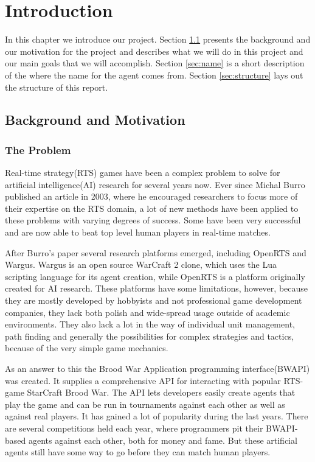 
\chapter{Introduction}
In this chapter we introduce our project. Section \ref{sec:background} presents the background and our motivation for the project and describes what we will do in this project and our main goals that we will accomplish. Section \ref{sec:name} is a short description of the where the name for the agent comes from. Section \ref{sec:structure} lays out the structure of this report.

\section{Background and Motivation}
\label{sec:background}

\subsection{The Problem}
Real-time strategy(RTS) games have been a complex problem to solve for artificial intelligence(AI) research for several years now. Ever since Michal Burro published an article in 2003\cite{buro2003real}, where he encouraged researchers to focus more of their expertise on the RTS domain, a lot of new methods have been applied to these problems with varying degrees of success. Some have been very successful and are now able to beat top level human players in real-time matches.\cite{campbell2002deep}

After Burro's paper several research platforms emerged, including OpenRTS\cite{buro2003orts} and Wargus\cite{wargus}. Wargus is an open source WarCraft 2 clone, which uses the Lua scripting language for its agent creation, while OpenRTS is a platform originally created for AI research. These platforms have some limitations, however, because they are mostly developed by hobbyists and not professional game development companies, they lack both polish and wide-spread usage outside of academic environments. They also lack a lot in the way of individual unit management, path finding and generally the possibilities for complex strategies and tactics, because of the very simple game mechanics.

As an answer to this the Brood War Application programming interface(BWAPI) was created. It supplies a comprehensive API for interacting with popular RTS-game StarCraft Brood War. The API lets developers easily create agents that play the game and can be run in tournaments against each other as well as against real players. It has gained a lot of popularity during the last years.\cite{bwapi} There are several competitions held each year, where programmers pit their BWAPI-based agents against each other, both for money and fame.\cite{sscait} But these artificial agents still have some way to go before they can match human players.\cite{eisbotvsfong}

